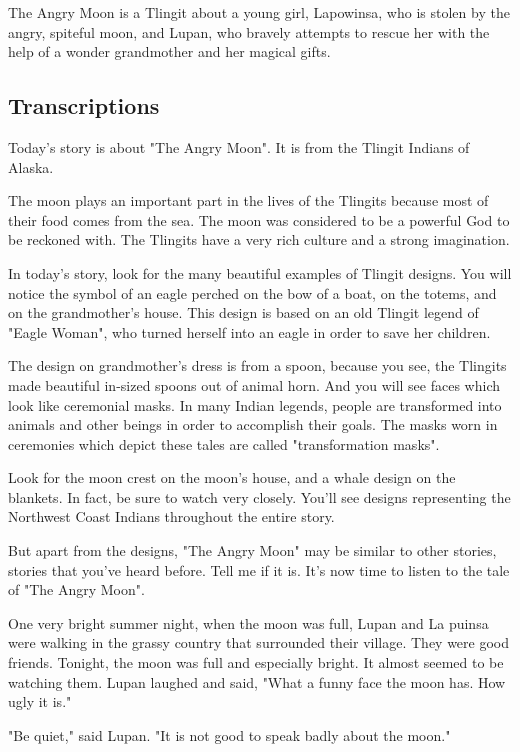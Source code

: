 The Angry Moon is a Tlingit about a young girl, Lapowinsa, who is stolen by the angry, spiteful moon, and Lupan, who bravely attempts to rescue her with the help of a wonder grandmother and her magical gifts.

\subsection{Transcriptions}

Today's story is about "The Angry Moon". It is from the Tlingit Indians of Alaska.

The moon plays an important part in the lives of the Tlingits because most of their food comes from the sea. The moon was considered to be a powerful God to be reckoned with. The Tlingits have a very rich culture and a strong imagination.

In today's story, look for the many beautiful examples of Tlingit designs. You will notice the symbol of an eagle perched on the bow of a boat, on the totems, and on the grandmother's house. This design is based on an old Tlingit legend of "Eagle Woman", who turned herself into an eagle in order to save her children.

The design on grandmother's dress is from a spoon, because you see, the Tlingits made beautiful in-sized spoons out of animal horn. And you will see faces which look like ceremonial masks. In many Indian legends, people are transformed into animals and other beings in order to accomplish their goals. The masks worn in ceremonies which depict these tales are called "transformation masks".

Look for the moon crest on the moon's house, and a whale design on the blankets. In fact, be sure to watch very closely. You'll see designs representing the Northwest Coast Indians throughout the entire story.

But apart from the designs, "The Angry Moon" may be similar to other stories, stories that you've heard before. Tell me if it is. It's now time to listen to the tale of "The Angry Moon".

One very bright summer night, when the moon was full, Lupan and La puinsa were walking in the grassy country that surrounded their village. They were good friends. Tonight, the moon was full and especially bright. It almost seemed to be watching them. Lupan laughed and said, "What a funny face the moon has. How ugly it is."

"Be quiet," said Lupan. "It is not good to speak badly about the moon."

